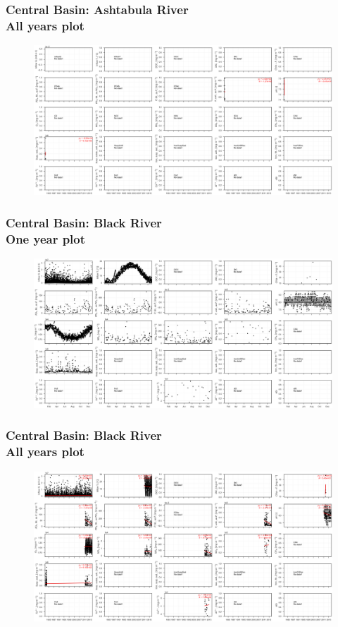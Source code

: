 \documentclass{beamer}
\begin{document}
\begin{frame}
\frametitle{Central Basin: Ashtabula River\\ All years plot}
\begin{figure}
\includegraphics[width=\textwidth]{rivers/Central basin/plot_all ashtabulariver.png}
\end{figure}
\end{frame}

\begin{frame}
\frametitle{Central Basin: Black River\\ One year plot}
\begin{figure}
\includegraphics[width=\textwidth]{rivers/Central basin/plot_1yr blackriver.png}
\end{figure}
\end{frame}

\begin{frame}
\frametitle{Central Basin: Black River\\ All years plot}
\begin{figure}
\includegraphics[width=\textwidth]{rivers/Central basin/plot_all blackriver.png}
\end{figure}
\end{frame}
\end{document}
